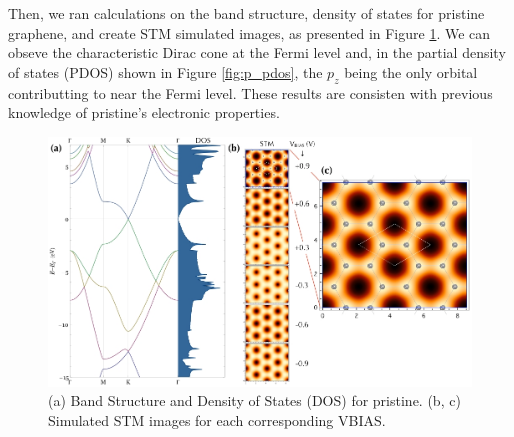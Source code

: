 \documentclass{article}
\begin{document}
Then, we ran calculations on the band structure, density of states for pristine graphene, and create STM simulated images, as presented in Figure \ref{fig:pristine_e}. We can obseve the characteristic Dirac cone at the Fermi level and, in the partial density of states (PDOS) shown in Figure \ref{fig:p_pdos}, the $p_z$ being the only orbital contributting to near the Fermi level. These results are consisten with previous knowledge of pristine's electronic properties. 
\begin{figure}[H]
  \centering
  \includegraphics[scale=0.45]{../figures/pristine_bs_dos.jpg}  
  \caption{(a) Band Structure and Density of States (DOS) for pristine. (b, c) Simulated STM images for each corresponding VBIAS.}
  \label{fig:pristine_e}
\end{figure}
\end{document}
